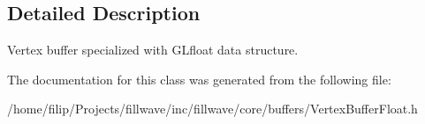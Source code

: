 \subsection{Detailed Description}
Vertex buffer specialized with G\+Lfloat data structure. 

The documentation for this class was generated from the following file\+:\begin{DoxyCompactItemize}
\item 
/home/filip/\+Projects/fillwave/inc/fillwave/core/buffers/Vertex\+Buffer\+Float.\+h\end{DoxyCompactItemize}
